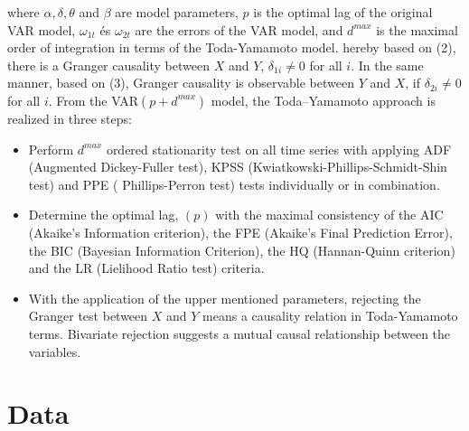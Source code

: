 \documentclass[12pt,bibliography=totoc]{article}
\begin{document}
where $\alpha, \delta, \theta$ and $\beta$ are model parameters, $p$ is the optimal lag of the original VAR model, $\omega_{1t}$ és $\omega_{2t}$  are the errors of the VAR model, and $d^{max}$ is the maximal order of integration in terms of the Toda-Yamamoto model.
hereby based on (2), there is a Granger causality between $X$ and $Y$, $\delta_{1i}  \neq 0$ for all $i$. In the same manner, based on (3),  Granger causality is observable between $Y$ and $X$, if  $\delta_{2i}  \neq 0$ for all $i$.
From the VAR$(p+d^{max})$  model, the Toda–Yamamoto approach is realized in three steps: 

\begin{itemize}
\item Perform $d^{max}$  ordered stationarity test on all time series with applying ADF (Augmented Dickey-Fuller test), KPSS (Kwiatkowski-Phillips-Schmidt-Shin test) and PPE ( Phillips-Perron test) tests individually or in combination. 

\item Determine the optimal lag, $(p)$ with the maximal consistency of the AIC (Akaike's Information criterion), the FPE (Akaike's Final Prediction Error), the BIC (Bayesian Information Criterion), the HQ (Hannan-Quinn criterion) and the LR (Lielihood Ratio test) criteria.

\item With the application of the upper mentioned parameters, rejecting the Granger test between $X$ and $Y$ means a causality relation in Toda-Yamamoto terms. Bivariate rejection suggests a mutual causal relationship between the variables.
\end{itemize}




\newpage 



\section{Data}
\end{document}
